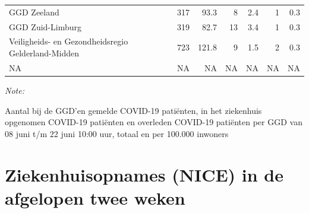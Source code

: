 \documentclass[
  english,
  man,floatsintext]{apa6}
\begin{document}
\begin{table}
\begin{threeparttable}
\begin{tabular}{lrrrrrr}
GGD Zeeland & 317 & 93.3 & 8 & 2.4 & 1 & 0.3\\
GGD Zuid-Limburg & 319 & 82.7 & 13 & 3.4 & 1 & 0.3\\
Veiligheids- en Gezondheidsregio Gelderland-Midden & 723 & 121.8 & 9 & 1.5 & 2 & 0.3\\
NA & NA & NA & NA & NA & NA & NA\\
\bottomrule
\end{tabular}
\begin{tablenotes}
\item \textit{Note: } 
\item Aantal bij de GGD’en gemelde COVID-19 patiënten, in het ziekenhuis opgenomen COVID-19 patiënten en overleden COVID-19 patiënten per GGD van 08 juni t/m 22 juni 10:00 uur, totaal en per 100.000 inwoners
\end{tablenotes}
\end{threeparttable}
\endgroup{}
\end{table}

\newpage

\hypertarget{ziekenhuisopnames-nice-in-de-afgelopen-twee-weken}{%
\section{Ziekenhuisopnames (NICE) in de afgelopen twee weken}\label{ziekenhuisopnames-nice-in-de-afgelopen-twee-weken}}
\end{document}
